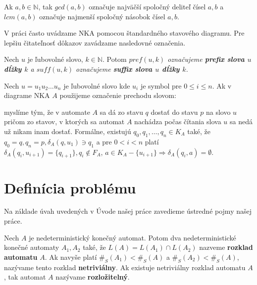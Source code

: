 \begin{notation}
Ak $ a,b \in \mathbb{N} $, tak $ gcd(a,b) $ označuje najväčší spoločný deliteľ čísel $ a,b $ a $ lcm(a,b) $ označuje najmenší spoločný násobok čísel $ a,b $.
\end{notation}


V práci často uvádzame NKA pomocou štandardného stavového diagramu. Pre lepšiu čitateľnosť dôkazov zavádzame nasledovné označenia.

\begin{notation}
Nech $ u $ je ľubovolné slovo, $ k \in \mathbb{N} $. Potom \em{}$ pref(u,k) $\em{} označujeme \textbf{prefix slova $ u $ dĺžky $ k $} a \em{}$ suff(u,k) $\em{} označujeme \textbf{suffix slova $ u $ dĺžky $ k $}.
\end{notation}

\begin{notation}
Nech $ u = u_1u_2 \ldots u_n$ je ľubovolné slovo kde $ u_i $ je symbol pre $ 0 \leq i \leq n $. Ak v diagrame NKA $ A $ použijeme označenie prechodu slovom:
\begin{figure}[H]
\centering
{}
\end{figure}

myslíme tým, že v automate $ A $ sa dá zo stavu $ q $ dostať do stavu $ p $ na slovo $ u $ pričom zo stavov, v ktorých sa automat $ A $ nachádza počas čítania slova $ u $ sa nedá už nikam inam dostať. Formálne, existujú $ q_0, q_1, \ldots, q_n \in K_A $ také, že $ q_0 = q, q_n = p, \delta_A(q, u_1) \ni q_1 $ a pre $ 0 < i < n $ platí $ \delta_A(q_i,u_{i+1}) = \lbrace q_{i+1} \rbrace, q_i \notin F_A $, $ a \in K_A - \lbrace u_{i+1} \rbrace \Rightarrow \delta_A(q_i,a) = \emptyset  $.
\end{notation}

\section{Definícia problému}
Na základe úvah uvedených v Úvode našej práce zavedieme ústredné pojmy našej práce.

\begin{definition}
Nech $ A $ je nedeterministický konečný automat. Potom dva nedeterministické konečné automaty $ A_1, A_2 $ také, že $ L(A)=L(A_1) \cap L(A_2) $ nazveme \textbf{rozklad automatu} $ A $. Ak navyše platí $ \#_S(A_1) < \#_S(A)$ a $ \#_S(A_2) < \#_S(A) $, nazývame tento rozklad \textbf{netriviálny}. Ak existuje netriviálny rozklad automatu $ A $, tak automat $ A $ nazývame \textbf{rozložitelný}.
\end{definition}

